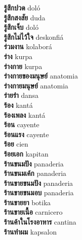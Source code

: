 \textbf{ รู้สึกปวด  } doló \\
\textbf{ รู้สึกสงสัย  } duda \\
\textbf{ รู้สึกเจ็บ  } doló \\
\textbf{ รู้สึกไม่ไว้ใจ  } deskonfiá \\
\textbf{ ร่วมงาน  } kolaborá \\
\textbf{ ร่าง  } kurpa \\
\textbf{ ร่างกาย  } kurpa \\
\textbf{ ร่างกายของมนุษย์  } anatomia \\
\textbf{ ร่างกายมนุษย์  } anatomia \\
\textbf{ ร่ายรำ  } dansa \\
\textbf{ ร้อง  } kantá \\
\textbf{ ร้องเพลง  } kantá \\
\textbf{ ร้อน  } cayente \\
\textbf{ ร้อนแรง  } cayente \\
\textbf{ ร้อย  } cien \\
\textbf{ ร้อยเอก  } kapitan \\
\textbf{ ร้านขนมปัง  } panaderia \\
\textbf{ ร้านขนมเค้ก  } panaderia \\
\textbf{ ร้านขายขนมปัง  } panaderia \\
\textbf{ ร้านขายขนมอบ  } panaderia \\
\textbf{ ร้านขายยา  } botika \\
\textbf{ ร้านขายเนื้อ  } carnicero \\
\textbf{ ร้านค้าในโรงอาหาร  } cantina \\
\textbf{ ร้านทำผม  } kapsalon \\
